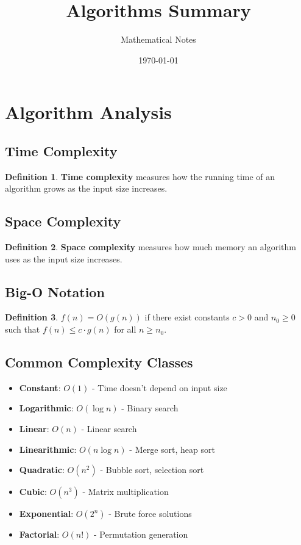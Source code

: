 \documentclass[11pt]{article}
\title{Algorithms Summary}
\author{Mathematical Notes}
\date{\today}
\theoremstyle{definition}
\newtheorem{definition}{Definition}[section]
\begin{document}
\maketitle

\tableofcontents
\newpage

\section{Algorithm Analysis}

\subsection{Time Complexity}
\begin{definition}
\textbf{Time complexity} measures how the running time of an algorithm grows as the input size increases.
\end{definition}

\subsection{Space Complexity}
\begin{definition}
\textbf{Space complexity} measures how much memory an algorithm uses as the input size increases.
\end{definition}

\subsection{Big-O Notation}
\begin{definition}
$f(n) = O(g(n))$ if there exist constants $c > 0$ and $n_0 \geq 0$ such that $f(n) \leq c \cdot g(n)$ for all $n \geq n_0$.
\end{definition}

\subsection{Common Complexity Classes}
\begin{itemize}
    \item \textbf{Constant}: $O(1)$ - Time doesn't depend on input size
    \item \textbf{Logarithmic}: $O(\log n)$ - Binary search
    \item \textbf{Linear}: $O(n)$ - Linear search
    \item \textbf{Linearithmic}: $O(n \log n)$ - Merge sort, heap sort
    \item \textbf{Quadratic}: $O(n^2)$ - Bubble sort, selection sort
    \item \textbf{Cubic}: $O(n^3)$ - Matrix multiplication
    \item \textbf{Exponential}: $O(2^n)$ - Brute force solutions
    \item \textbf{Factorial}: $O(n!)$ - Permutation generation
\end{itemize}
\end{document}
